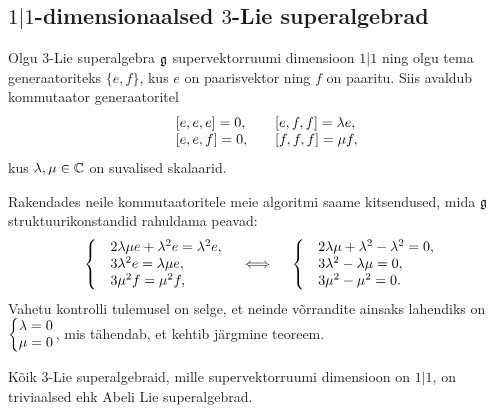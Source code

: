 
\subsection{\texorpdfstring{$1|1$}{1|1}-dimensionaalsed
    \texorpdfstring{$3$}{3}-Lie superalgebrad}

Olgu $3$-Lie superalgebra $\mathfrak{g}$ supervektorruumi dimensioon
$1|1$ ning olgu tema generaatoriteks $\{ e, f \}$, kus $e$ on paarisvektor
ning $f$ on paaritu. Siis avaldub kommutaator generaatoritel
\begin{align*}
    \begin{matrix*}[l]
        &[e, e, e] = 0,\quad
        &[e, f, f] = \l e, \\
        &[e, e, f] = 0,\quad
        &[f, f, f] = \m f,
    \end{matrix*}
\end{align*}
kus $\lambda, \mu \in \mathbb{C}$ on suvalised skalaarid.

Rakendades neile kommutaatoritele meie algoritmi saame kitsendused,
mida $\mathfrak{g}$ struktuurikonstandid rahuldama peavad:
\begin{align*}
    \left\{
        \begin{matrix*}[l]
            &2\l\m e + \l^2 e =  \l^2 e, \\
            &3\l^2 e = \l\m e, \\
            &3\m^2 f = \m^2 f,
        \end{matrix*}
    \right.
    \quad \iff \quad
    \left\{
        \begin{matrix*}[l]
            &2\l\m + \l^2 - \l^2 = 0, \\
            &3\l^2 - \l\m = 0, \\
            &3\m^2 - \m^2 = 0.
        \end{matrix*}
    \right.
\end{align*}
Vahetu kontrolli tulemusel on selge, et neinde võrrandite ainsaks lahendiks on
$\left\{ \begin{matrix} \lambda = 0 \\ \mu = 0 \end{matrix} \right.$,
mis tähendab, et kehtib järgmine teoreem.

\begin{thm}
    Kõik $3$-Lie superalgebraid, mille supervektorruumi dimensioon on $1|1$,
    on triviaalsed ehk Abeli Lie superalgebrad.
\end{thm}
